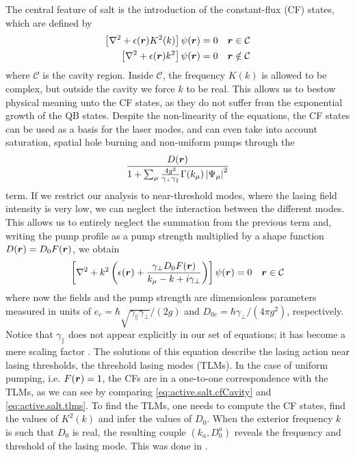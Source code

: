 The central feature of \gls{salt} is the introduction of the constant-flux (CF)
states, which are defined by
	\begin{subequations}
	\begin{align}
		\left[\nabla^2+\epsilon(\boldsymbol{r})K^2(k)\right]\psi(\boldsymbol{r})	&=	0	& \boldsymbol{r}\in\mathcal{C}		\label{eq:active.salt.cfCavity}\\
		\left[\nabla^2+\epsilon(\boldsymbol{r})k^2\right]\psi(\boldsymbol{r})		  &=	0	& \boldsymbol{r}\notin\mathcal{C}	\label{eq:active.salt.cfOutside}
	\end{align}
	\end{subequations}
where $\mathcal{C}$ is the cavity region. Inside $\mathcal{C}$, 
the frequency $K(k)$ is allowed to be complex, but outside the cavity
we force $k$ to be real. This allows us to bestow physical meaning
unto the CF states, as they do not suffer from the exponential
growth of the QB states. Despite the non-linearity of the equations, 
the CF states can be used as a basis for the laser modes, and can even 
take into account saturation, spatial hole burning and non-uniform
pumps through the 
	\begin{equation*}
		\frac{D(\boldsymbol{r})}{1+\sum_\mu\frac{4g^2}{\gamma_\perp\gamma_\parallel}\Gamma(k_\mu)\left|\Psi_\mu\right|^2}
	\end{equation*}
term. If we restrict our analysis to near-threshold modes, where the lasing field intensity
is very low,  we can neglect the interaction between the different modes. This allows us
to entirely neglect the summation from the previous term
and, writing the pump profile as a pump strength multiplied by a shape function $D(\boldsymbol{r})=D_0F(\boldsymbol{r})$, 
we obtain
	\begin{align}
		\label{eq:active.salt.tlms}
		\left[\nabla^2+k^2\left(\epsilon(\boldsymbol{r})+\frac{\gamma_\perp D_0F(\boldsymbol{r})}{k_\mu-k+i\gamma_\perp}\right)\right]\psi(\boldsymbol{r}) &=0 & \boldsymbol{r}\in\mathcal{C}
	\end{align}
where now the fields and the pump strength are dimensionless parameters measured in units of 
$e_c = \hbar\sqrt{\gamma_\parallel\gamma_\perp}/(2g)$ and 
$D_{0c}=\hbar\gamma_\perp/(4\pi g^2)$, respectively. 
Notice that $\gamma_\parallel$ does not appear explicitly in our set of equations; 
it has become a mere scaling factor \cite[p.~19--20]{GE2010b}.
The solutions of this equation describe the lasing action near lasing thresholds, the threshold lasing modes (TLMs). 
In the case of uniform pumping, i.e. $F(\boldsymbol{r})=1$,
the CFs are in a one-to-one correspondence with the TLMs, as we can see by comparing
\eqref{eq:active.salt.cfCavity} and \eqref{eq:active.salt.tlms}. To find
the TLMs, one needs to compute the CF states, find the values of $K^2(k)$ and
infer the values of $D_0$. When the exterior frequency $k$ is such that $D_0$
is real, the resulting couple $(k_a, D_0^a)$ reveals the frequency and threshold
of the lasing mode. This was done in \cite{GAG2014a}. 

